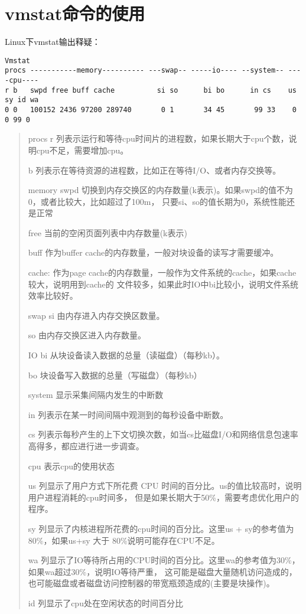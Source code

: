 \section{vmstat命令的使用}
\label{sec:vmstatCmd}

Linux下vmstat输出释疑：

\begin{verbatim}
Vmstat
procs -----------memory---------- ---swap-- -----io---- --system-- ----cpu----
r b   swpd free buff cache          si so      bi bo      in cs    us sy id wa
0 0   100152 2436 97200 289740       0 1       34 45       99 33    0 0 99 0
\end{verbatim}

\begin{quote}
procs
r 列表示运行和等待cpu时间片的进程数，如果长期大于cpu个数，说明cpu不足，需要增加cpu。

b 列表示在等待资源的进程数，比如正在等待I/O、或者内存交换等。

memory
swpd 切换到内存交换区的内存数量(k表示)。如果swpd的值不为0，或者比较大，比如超过了100m，
     只要si、so的值长期为0，系统性能还是正常

free 当前的空闲页面列表中内存数量(k表示)

buff 作为buffer cache的内存数量，一般对块设备的读写才需要缓冲。

cache: 作为page cache的内存数量，一般作为文件系统的cache，如果cache较大，说明用到cache的
       文件较多，如果此时IO中bi比较小，说明文件系统效率比较好。

swap
si 由内存进入内存交换区数量。

so 由内存交换区进入内存数量。


IO
bi 从块设备读入数据的总量（读磁盘）（每秒kb）。

bo 块设备写入数据的总量（写磁盘）（每秒kb）


system 显示采集间隔内发生的中断数

in 列表示在某一时间间隔中观测到的每秒设备中断数。

cs 列表示每秒产生的上下文切换次数，如当cs比磁盘I/O和网络信息包速率高得多，都应进行进一步调查。



cpu 表示cpu的使用状态

us 列显示了用户方式下所花费 CPU 时间的百分比。us的值比较高时，说明用户进程消耗的cpu时间多，
   但是如果长期大于50\%，需要考虑优化用户的程序。

sy 列显示了内核进程所花费的cpu时间的百分比。这里us + sy的参考值为80\%，如果us+sy 大于
   80\%说明可能存在CPU不足。

wa 列显示了IO等待所占用的CPU时间的百分比。这里wa的参考值为30\%，如果wa超过30\%，说明IO等待严重，
   这可能是磁盘大量随机访问造成的，也可能磁盘或者磁盘访问控制器的带宽瓶颈造成的(主要是块操作)。

id 列显示了cpu处在空闲状态的时间百分比
\end{quote}


